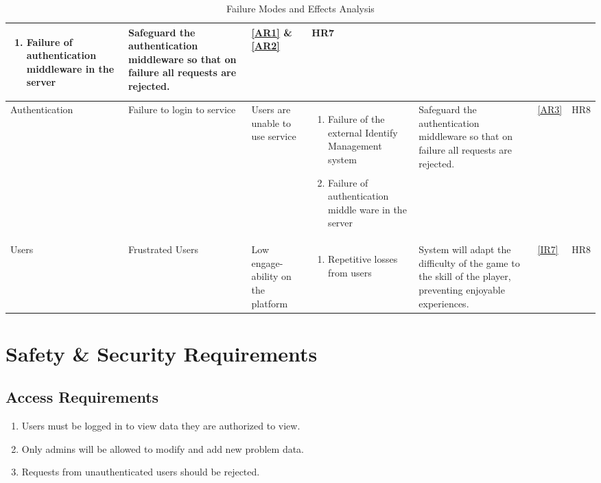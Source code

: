 \documentclass{article}
\begin{document}
\begin{landscape}
\begin{table}[H]
\begin{tabularx}{1.46\textwidth}{|p{2.3cm}|p{2.3cm}|p{3.5cm}|p{4.4cm}|p{4.5cm}|p{1cm}|p{1cm}|}
\begin{enumerate}
            \item Failure of authentication middleware in the server
        \end{enumerate} &
        Safeguard the authentication middleware so that on failure all requests are rejected.	 &
        \ref{AR1} \& \ref{AR2}&
        HR7 \\
        \hline
        Authentication	 & 
        Failure to login to service	 & 
        Users are unable to use service	 & 
        \begin{enumerate}
            \item Failure of the external Identify Management system
            \item Failure of authentication middle ware in the server
        \end{enumerate} &
        Safeguard the authentication middleware so that on failure all requests are rejected. &
        \ref{AR3} &
        HR8 \\ \hline
        Users	 & 
        Frustrated Users	 & 
        Low engage-ability on the platform & 
        \begin{enumerate}
            \item Repetitive losses from users
        \end{enumerate} &
        System will adapt the difficulty of the game to the skill of the player, preventing enjoyable experiences. &
        \ref{IR7} &
        HR8 \\ \hline
    \end{tabularx}
    \caption{Failure Modes and Effects Analysis}
\end{table}

\end{landscape}



\section{Safety \& Security Requirements}

\subsection{Access Requirements}
\begin{enumerate}[label=AR.\arabic*]
    \item Users must be logged in to view data they are authorized to view. \label{AR1}
    \item Only admins will be allowed to modify and add new problem data. \label{AR2}
    \item Requests from unauthenticated users should be rejected. \label{AR3}
\end{enumerate}
\end{document}
